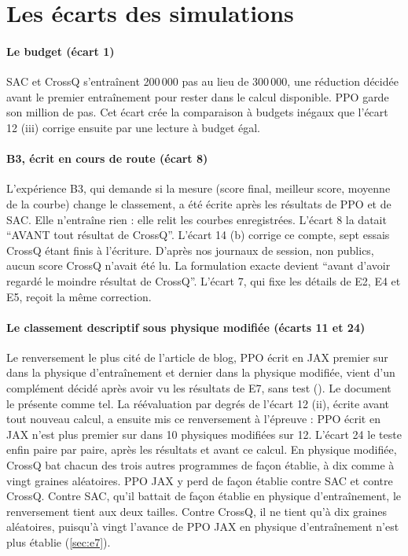 \section{Les écarts des simulations}
\label{sec:ecarts-sim}

\paragraph{Le budget (écart 1)} SAC et CrossQ s'entraînent 200\,000 pas au lieu de 300\,000, une
réduction décidée avant le premier entraînement pour rester dans le calcul disponible. PPO garde son million de pas. Cet écart crée la
comparaison à budgets inégaux que l'écart 12 (iii) corrige ensuite par une lecture à budget égal.

\paragraph{B3, écrit en cours de route (écart 8)} L'expérience B3, qui demande si la mesure (score
final, meilleur score, moyenne de la courbe) change le classement, a été écrite
après les résultats de PPO et de SAC. Elle n'entraîne rien : elle relit les courbes enregistrées. L'écart 8 la datait \enquote{AVANT tout résultat de CrossQ}. L'écart 14 (b) corrige ce
compte, sept essais CrossQ étant finis à l'écriture. D'après nos journaux de session, non publics,
aucun score CrossQ n'avait été lu. La formulation exacte devient \enquote{avant d'avoir regardé le
moindre résultat de CrossQ}. L'écart 7, qui fixe les détails de E2, E4 et E5, reçoit la même
correction.

\paragraph{Le classement descriptif sous physique modifiée (écarts 11 et 24)} Le renversement le
plus cité de l'article de blog, PPO écrit en JAX premier sur  dans la physique
d'entraînement et dernier dans la physique modifiée, vient d'un complément décidé après avoir vu les
résultats de E7, sans test (). Le document le présente comme tel. La
réévaluation par degrés de l'écart 12 (ii), écrite avant tout nouveau calcul, a ensuite mis ce
renversement à l'épreuve : PPO écrit en JAX n'est plus premier sur  dans 10 physiques
modifiées sur 12. L'écart 24 le teste enfin paire par paire, après les résultats et avant ce calcul.
En physique modifiée, CrossQ bat chacun des trois autres programmes de façon établie, à dix comme à
vingt graines aléatoires. PPO JAX y perd de façon établie contre SAC et contre CrossQ. Contre SAC,
qu'il battait de façon établie en physique d'entraînement, le renversement tient aux deux tailles.
Contre CrossQ, il ne tient qu'à dix graines aléatoires, puisqu'à vingt l'avance de PPO JAX en
physique d'entraînement n'est plus établie (\cref{sec:e7}).

